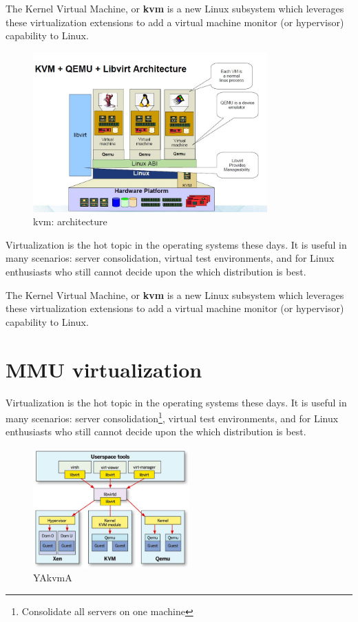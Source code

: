 \documentclass[a4paper,twocolumn,10pt]{article}
\begin{document}
  \noindent The Kernel Virtual Machine, or \textbf{kvm} is a new Linux
  subsystem which leverages these virtualization extensions
  to add a virtual machine monitor (or hypervisor) capability to Linux.

  
   \begin{figure}[h]
     \centering
      \includegraphics[width=90mm]{arch.jpg}
      \caption{kvm: architecture}
      \label{arch}
   \end{figure}

  
  \noindent Virtualization is the hot topic in the operating systems 
  these days. It is useful in many scenarios: server consolidation,
  virtual test environments, and for Linux enthusiasts who
  still cannot decide upon the which distribution is best.
  
  \noindent The Kernel Virtual Machine, or \textbf{kvm} is a new Linux
  subsystem which leverages these virtualization extensions
  to add a virtual machine monitor (or hypervisor) capability to Linux.
  \pagebreak
  
  
\section{MMU virtualization}
Virtualization is the hot topic in the operating systems 
  these days. It is useful in many scenarios: server consolidation\footnote{Consolidate all servers on one machine},
  virtual test environments, and for Linux enthusiasts who
  still cannot decide upon the which distribution is best.
  
  \begin{figure}
   \centering
   \includegraphics[width=60mm]{arch1.jpg}
   \caption{YAkvmA}
   \label{arch1}
  \end{figure}
\end{document}
